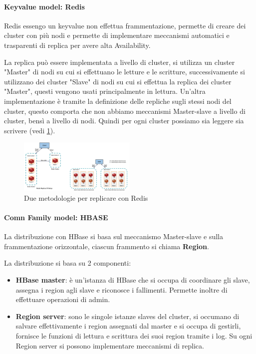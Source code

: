 \paragraph{Keyvalue model: Redis}
Redis essengo un keyvalue non effettua frammentazione, permette di creare dei 
cluster con più nodi e permette di implementare meccanismi automatici e trasparenti
di replica per avere alta Availability.

La replica può essere implementata a livello di cluster, si utilizza un cluster 
"Master" di nodi su cui si effettuano le letture e le scritture, successivamente 
si utilizzano dei cluster "Slave" di nodi su cui si effettua la replica dei cluster 
"Master", questi vengono usati principalmente in lettura. Un'altra implementazione 
è tramite la definizione delle repliche sugli stessi nodi del cluster, questo 
comporta che non abbiamo meccanismi Master-slave a livello di cluster, bensì a livello
di nodi. Quindi per ogni cluster possiamo sia leggere sia scrivere (vedi \ref{fig:dist_redis}). 


\begin{figure} [!h]
      \centering
      \includegraphics[width=0.5\textwidth]{img/nosql/redis_distribuited.png}
      \caption{Due metodologie per replicare con Redis}
      \label{fig:dist_redis}
\end{figure}

\paragraph{Comn Family model: HBASE}
La distribuzione con HBase si basa sul meccanismo Master-slave e sulla frammentazione 
orizzontale, ciascun frammento si chiama \textbf{Region}. 

La distribuzione si basa su 2 componenti:
\begin{itemize}
      \item \textbf{HBase master}: è un'istanza di HBase che si occupa di coordinare gli slave,
      assegna i region agli slave e riconosce i fallimenti. Permette inoltre di 
      effettuare operazioni di admin.
      \item \textbf{Region server}: sono le singole istanze slaves del cluster,
      si occumano di salvare effettivamente i region assegnati dal master e si 
      occupa di gestirli, fornisce le funzioni di lettura e scrittura dei suoi region
      tramite i log. Su ogni Region server si possono implementare meccanismi di replica.
\end{itemize}

